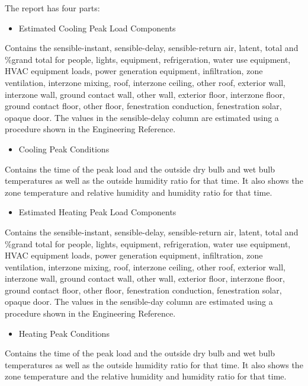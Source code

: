 The report has four parts:

\begin{itemize}
\tightlist
\item
  Estimated Cooling Peak Load Components
\end{itemize}

Contains the sensible-instant, sensible-delay, sensible-return air, latent, total and \%grand total for people, lights, equipment, refrigeration, water use equipment, HVAC equipment loads, power generation equipment, infiltration, zone ventilation, interzone mixing, roof, interzone ceiling, other roof, exterior wall, interzone wall, ground contact wall, other wall, exterior floor, interzone floor, ground contact floor, other floor, fenestration conduction, fenestration solar, opaque door. The values in the sensible-delay column are estimated using a procedure shown in the Engineering Reference.

\begin{itemize}
\tightlist
\item
  Cooling Peak Conditions
\end{itemize}

Contains the time of the peak load and the outside dry bulb and wet bulb temperatures as well as the outside humidity ratio for that time. It also shows the zone temperature and relative humidity and humidity ratio for that time.

\begin{itemize}
\tightlist
\item
  Estimated Heating Peak Load Components
\end{itemize}

Contains the sensible-instant, sensible-delay, sensible-return air, latent, total and \%grand total for people, lights, equipment, refrigeration, water use equipment, HVAC equipment loads, power generation equipment, infiltration, zone ventilation, interzone mixing, roof, interzone ceiling, other roof, exterior wall, interzone wall, ground contact wall, other wall, exterior floor, interzone floor, ground contact floor, other floor, fenestration conduction, fenestration solar, opaque door. The values in the sensible-day column are estimated using a procedure shown in the Engineering Reference.

\begin{itemize}
\tightlist
\item
  Heating Peak Conditions
\end{itemize}

Contains the time of the peak load and the outside dry bulb and wet bulb temperatures as well as the outside humidity ratio for that time. It also shows the zone temperature and the relative humidity and humidity ratio for that time.

